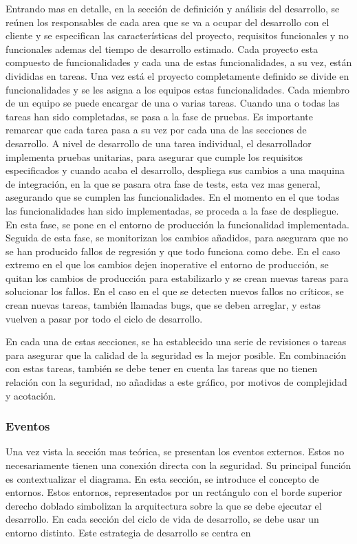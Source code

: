 \documentclass[12pt]{report} %
\begin{document}
Entrando mas en detalle, en la sección de definición y análisis del desarrollo,
se reúnen los responsables de cada area que se va a ocupar del desarrollo con el
cliente y se especifican las características del proyecto, requisitos
funcionales y no funcionales ademas del tiempo de desarrollo estimado.  Cada
proyecto esta compuesto de funcionalidades y cada una de estas funcionalidades,
a su vez, están divididas en tareas.  Una vez está el proyecto completamente
definido se divide en funcionalidades y se les asigna a los equipos estas
funcionalidades.  Cada miembro de un equipo se puede encargar de una o varias
tareas.  Cuando una o todas las tareas han sido completadas, se pasa a la fase
de pruebas.  Es importante remarcar que cada tarea pasa a su vez por cada una de
las secciones de desarrollo.  A nivel de desarrollo de una tarea individual, el
desarrollador implementa pruebas unitarias, para asegurar que cumple los
requisitos especificados y cuando acaba el desarrollo, despliega sus cambios a
una maquina de integración, en la que se pasara otra fase de tests, esta vez mas
general, asegurando que se cumplen las funcionalidades.  En el momento en el que
todas las funcionalidades han sido implementadas, se proceda a la fase de
despliegue.  En esta fase, se pone en el entorno de producción la funcionalidad
implementada.  Seguida de esta fase, se monitorizan los cambios añadidos, para
asegurara que no se han producido fallos de regresión y que todo funciona como
debe.  En el caso extremo en el que los cambios dejen inoperative el entorno de
producción, se quitan los cambios de producción para estabilizarlo y se crean
nuevas tareas para solucionar los fallos.  En el caso en el que se detecten
nuevos fallos no críticos, se crean nuevas tareas, también llamadas bugs, que se
deben arreglar, y estas vuelven a pasar por todo el ciclo de desarrollo.

En cada una de estas secciones, se ha establecido una serie de revisiones o
tareas para asegurar que la calidad de la seguridad es la mejor posible.  En
combinación con estas tareas, también se debe tener en cuenta las tareas que no
tienen relación con la seguridad, no añadidas a este gráfico, por motivos de
complejidad y acotación.

\subsubsection{Eventos}

Una vez vista la sección mas teórica, se presentan los eventos externos.  Estos
no necesariamente tienen una conexión directa con la seguridad.  Su principal
función es contextualizar el diagrama.  En esta sección, se introduce el
concepto de entornos.  Estos entornos, representados por un rectángulo con el
borde superior derecho doblado simbolizan la arquitectura sobre la que se debe
ejecutar el desarrollo.  En cada sección del ciclo de vida de desarrollo, se
debe usar un entorno distinto. Este estrategia de desarrollo se centra en 
\end{document}
